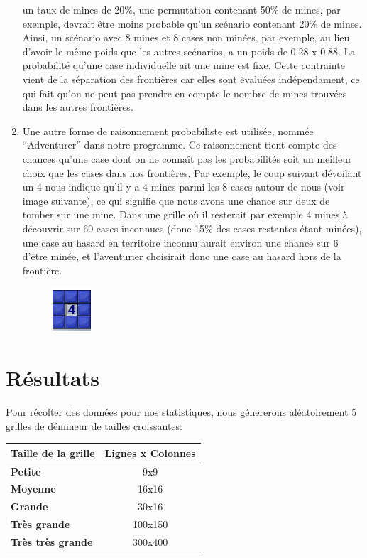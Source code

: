 \documentclass{article}
\begin{document}
\begin{enumerate}
              un taux de mines de 20\%, une permutation contenant 50\% de mines, 
              par exemple, devrait être moins probable qu’un scénario contenant 20\% de 
              mines. Ainsi, un scénario avec 8 mines et 8 cases non minées, par exemple, 
              au lieu d’avoir le même poids que les autres scénarios, a un poids 
              de 0.28 x 0.88. La probabilité qu’une case individuelle ait une mine est fixe. 
              Cette contrainte vient de la séparation des frontières car elles sont évaluées 
              indépendament, ce qui fait qu’on ne peut pas prendre en compte le nombre de mines 
              trouvées dans les autres frontières. 
        \item Une autre forme de raisonnement probabiliste est utilisée, nommée “Adventurer” 
              dans notre programme. Ce raisonnement tient compte des chances qu’une case dont 
              on ne connaît pas les probabilités soit un meilleur choix que les cases dans nos frontières. 
              Par exemple, le coup suivant dévoilant un 4 nous indique qu’il y a 4 mines parmi 
              les 8 cases autour de nous (voir image suivante), ce qui signifie que nous avons une chance sur deux de 
              tomber sur une mine. Dans une grille où il resterait par exemple 4 mines à découvrir 
              sur 60 cases inconnues (donc 15\% des cases restantes étant minées), une case au 
              hasard en territoire inconnu aurait environ une chance sur 6 d’être minée, et 
              l’aventurier choisirait donc une case au hasard hors de la frontière. 
                \begin{figure}[h!]
                \centering
                \includegraphics[scale=.5]{./demineur_3.png}
                \end{figure}
\end{enumerate}

\section{Résultats}
Pour récolter des données pour nos statistiques, nous génererons aléatoirement 5 grilles de démineur de tailles croissantes: \\
\begin{tabular}{| l | c |}
        \hline
        \textbf{Taille de la grille} & \textbf{Lignes x Colonnes} \\
        \hline
        \textbf{Petite} & 9x9 \\
        \hline
        \textbf{Moyenne} & 16x16 \\
        \hline
        \textbf{Grande} & 30x16 \\
        \hline
        \textbf{Très grande} & 100x150 \\
        \hline
        \textbf{Très très grande} & 300x400 \\
        \hline
\end{tabular}
\end{document}
